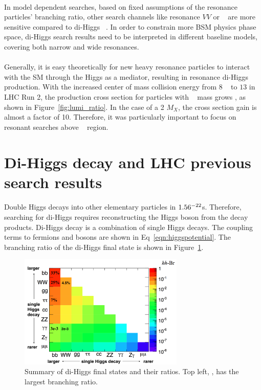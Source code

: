 \paragraph{}
In model dependent searches, based on fixed assumptions of the resonance particles' branching ratio, other search channels like resonance $VV$ or \ttbar~ are more sensitive compared to di-Higgs ~\cite{Cavaliere:2203605}. In order to constrain more BSM physics phase space, di-Higgs search results need to be interpreted in different baseline models, covering both narrow and wide resonances.

\paragraph{}
Generally, it is easy theoretically for new heavy resonance particles to interact with the SM through the Higgs as a mediator, resulting in resonance di-Higgs production. 
With the increased center of mass collision energy from $8$ \TeV~ to $13$ \TeV in LHC Run 2, the production cross section for particles with \TeV~ mass grows , as shown in Figure~\ref{fig:lumi_ratio}.
In the case of a 2 \TeV $M_X$, the cross section gain is almost a factor of 10. 
Therefore, it was particularly important to focus on resonant searches above \TeV~ region.


\section{Di-Higgs decay and LHC previous search results}
\paragraph{}
Double Higgs decays into other elementary particles in $1.56 \time 10 ^{-22}$s.
Therefore, searching for di-Higgs requires reconstructing the Higgs boson from the decay products.
Di-Higgs decay is a combination of single Higgs decays. The coupling terms to fermions and bosons are shown in Eq~\ref{eqn:higgspotential}. 
The branching ratio of the di-Higgs final state is shown in Figure~\ref{fig:HH_BR}.

\begin{figure}[h!]
  \centering
  \includegraphics[width=0.7\textwidth]{figures/theory/HH_BR}
  \caption{Summary of di-Higgs final states and their ratios. Top left, \bbbb, has the largest branching ratio.}
  \label{fig:HH_BR}
\end{figure}

